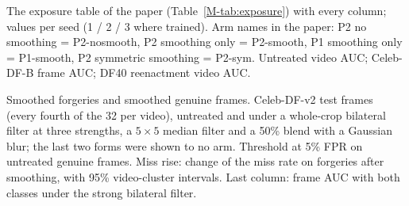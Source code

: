 \documentclass[10pt]{article}
\begin{document}
\begin{table}
\centering
\caption{The exposure table of the paper (Table~\ref{M-tab:exposure}) with every column; values per seed (1 / 2 / 3 where trained).
Arm names in the paper: P2 no smoothing = P2-nosmooth, P2 smoothing only = P2-smooth, P1 smoothing only = P1-smooth, P2 symmetric
smoothing = P2-sym. Untreated video AUC; Celeb-DF-B frame AUC; DF40 reenactment video AUC.}
\label{tab:tradeofffull}
\scriptsize
\begin{adjustbox}{max width=\linewidth}\end{adjustbox}
\end{table}

\begin{table}
\centering
\caption{Smoothed forgeries and smoothed genuine frames. Celeb-DF-v2 test frames (every fourth of the 32 per video), untreated and
under a whole-crop bilateral filter at three strengths, a $5\times5$ median filter and a 50\% blend with a Gaussian blur; the last
two forms were shown to no arm. Threshold at 5\% FPR on untreated genuine frames. Miss rise: change of the miss rate on forgeries
after smoothing, with 95\% video-cluster intervals. Last column: frame AUC with both classes under the strong bilateral filter.}
\label{tab:v4evasion}
\scriptsize
\begin{adjustbox}{max width=\linewidth}\end{adjustbox}
\end{table}
\end{document}
